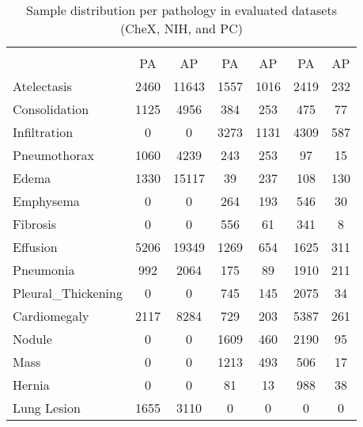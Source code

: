 \documentclass[final,1p,times,authoryear]{elsarticle}
\begin{document}
\begin{table}[htbp]
    \centering
    \caption[Sample Distribution Per Pathology in Evaluated Datasets (CheX, NIH, and PC)]{Sample distribution per pathology in evaluated datasets (CheX, NIH, and PC)}%
    \label{tab:taxonomy.table.2.datasets.ninstances}
    \begin{tabular}{lcccccc}
        \rowcolor[HTML]{79A8A4}
        \multicolumn{1}{c}{\cellcolor{table_title}{}} &
        \multicolumn{2}{c}{\cellcolor{table_title}{\textbf{CheXpert}}} &
        \multicolumn{2}{c}{\cellcolor{table_title}{\textbf{NIH}}} &
        \multicolumn{2}{c}{\cellcolor{table_title}{\textbf{PADCHEST}}} \\
        \rowcolor[HTML]{79A8A4}
        \multicolumn{1}{c}{\multirow{-2}{*}{\cellcolor{table_title}{\textbf{Pathologies\textbackslash{}Dataset}}}} & {PA} & {AP} & {PA} & {AP} & {PA} & {AP} \\
        Atelectasis        & 2460 & 11643 & 1557 & 1016 & 2419 & 232 \\
        Consolidation      & 1125 & 4956  & 384  & 253  & 475  & 77  \\
        Infiltration       & 0    & 0     & 3273 & 1131 & 4309 & 587 \\
        Pneumothorax       & 1060 & 4239  & 243  & 253  & 97   & 15  \\
        Edema              & 1330 & 15117 & 39   & 237  & 108  & 130 \\
        Emphysema          & 0    & 0     & 264  & 193  & 546  & 30  \\
        Fibrosis           & 0    & 0     & 556  & 61   & 341  & 8   \\
        Effusion           & 5206 & 19349 & 1269 & 654  & 1625 & 311 \\
        Pneumonia          & 992  & 2064  & 175  & 89   & 1910 & 211 \\
        Pleural\_Thickening& 0    & 0     & 745  & 145  & 2075 & 34  \\
        Cardiomegaly       & 2117 & 8284  & 729  & 203  & 5387 & 261 \\
        Nodule             & 0    & 0     & 1609 & 460  & 2190 & 95  \\
        Mass               & 0    & 0     & 1213 & 493  & 506  & 17  \\
        Hernia             & 0    & 0     & 81   & 13   & 988  & 38  \\
        Lung Lesion        & 1655 & 3110  & 0    & 0    & 0    & 0   \\

\end{tabular}
\end{table}
\end{document}
